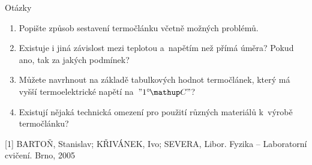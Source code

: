 \documentclass[smaller,aspectratio=1610,handout]{beamer}
\begin{document}
\begin{frame}[plain]
	\titlepage
\end{frame}

\begin{frame}[plain]{Otázky}
	\begin{enumerate}
		\item Popište způsob sestavení termočlánku včetně možných problémů.
		\item Existuje i jiná závislost mezi teplotou a~napětím než přímá úměra?
			Pokud ano, tak za jakých podmínek?
		\item Můžete navrhnout na základě tabulkových hodnot termočlánek, který má
			vyšší termoelektrické napětí na~$"1 \C"$?
		\item Existují nějaká technická omezení pro použití různých materiálů
			k~výrobě termočlánku?
	\end{enumerate}
\end{frame}

\begin{frame}[plain]
	
	[1] \medspace BARTOŇ, Stanislav; KŘIVÁNEK, Ivo; SEVERA, Libor. Fyzika --
	Laboratorní cvičení. Brno, 2005
\end{frame}
\end{document}
